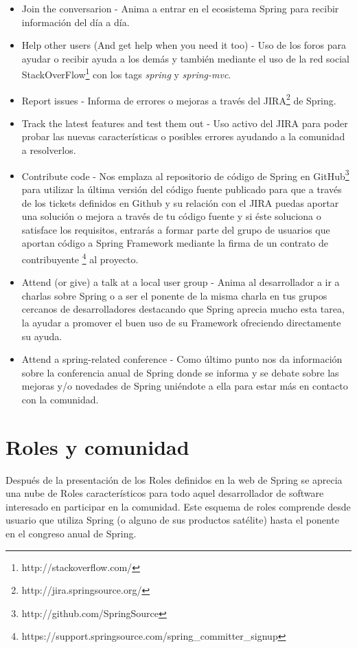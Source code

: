 \documentclass[11pt]{scrartcl}
\begin{document}
\begin{itemize}
    \item Join the conversarion - Anima a entrar en el ecosistema Spring para recibir informaci\'on del d\'ia a d\'ia.
    \item Help other users (And get help when you need it too) - Uso de los foros para ayudar o recibir ayuda a los dem\'as y tambi\'en mediante el uso de la red social StackOverFlow\footnote{http://stackoverflow.com/} con los tags \emph{spring} y \emph{spring-mvc}.
    \item Report issues - Informa de errores o mejoras a trav\'es del JIRA\footnote{http://jira.springsource.org/} de Spring.
    \item Track the latest features and test them out - Uso activo del JIRA para poder probar las nuevas caracter\'isticas o posibles errores ayudando a la comunidad a resolverlos.
    \item Contribute code - Nos emplaza al repositorio de c\'odigo de Spring en GitHub\footnote{http://github.com/SpringSource} para utilizar la \'ultima versi\'on del c\'odigo fuente publicado para que a trav\'es de los tickets definidos en Github y su relaci\'on con el JIRA puedas aportar una soluci\'on o mejora a trav\'es de tu c\'odigo fuente y si \'este soluciona o satisface los requisitos, entrar\'as a formar parte del grupo de usuarios que aportan c\'odigo a Spring Framework mediante la firma de un contrato de contribuyente \footnote{https://support.springsource.com/spring\_committer\_signup} al proyecto.
    \item Attend (or give) a talk at a local user group - Anima al desarrollador a ir a charlas sobre Spring o a ser el ponente de la misma charla en tus grupos cercanos de desarrolladores destacando que Spring aprecia mucho esta tarea, la ayudar a promover el buen uso de su Framework ofreciendo directamente su ayuda.
    \item Attend a spring-related conference - Como \'ultimo punto nos da informaci\'on sobre la conferencia anual de Spring donde se informa y se debate sobre las mejoras y/o novedades de Spring uni\'endote a ella para estar m\'as en contacto con la comunidad.
\end{itemize}

\section{Roles y comunidad}

Despu\'es de la presentaci\'on de los Roles definidos en la web de Spring se aprecia una nube de Roles caracter\'isticos para todo aquel desarrollador de software interesado en participar en la comunidad. Este esquema de roles comprende desde usuario que utiliza Spring (o alguno de sus productos sat\'elite) hasta el ponente en el congreso anual de Spring.
\end{document}
